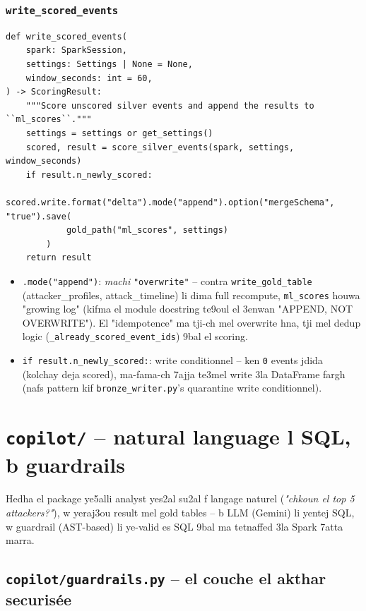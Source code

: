 \documentclass[11pt,a4paper]{report}
\DeclareRobustCommand{\code}[1]{\texttt{#1}}
\DeclareRobustCommand{\file}[1]{\texttt{\color{amber}#1}}
\begin{document}
\subsection{\code{write\_scored\_events}}

\begin{lstlisting}[style=pystyle]
def write_scored_events(
    spark: SparkSession,
    settings: Settings | None = None,
    window_seconds: int = 60,
) -> ScoringResult:
    """Score unscored silver events and append the results to ``ml_scores``."""
    settings = settings or get_settings()
    scored, result = score_silver_events(spark, settings, window_seconds)
    if result.n_newly_scored:
        scored.write.format("delta").mode("append").option("mergeSchema", "true").save(
            gold_path("ml_scores", settings)
        )
    return result
\end{lstlisting}

\begin{itemize}
  \item \code{.mode("append")}: \emph{machi} \code{"overwrite"} --
        contra \code{write\_gold\_table} (attacker\_profiles, attack\_timeline)
        li dima full recompute, \code{ml\_scores} houwa "growing log" (kifma
        el module docstring te9oul el 3enwan "APPEND, NOT OVERWRITE").
        El "idempotence" ma tji-ch mel overwrite hna, tji mel dedup logic
        (\code{\_already\_scored\_event\_ids}) 9bal el scoring.
  \item \code{if result.n\_newly\_scored:}: write conditionnel -- ken
        \code{0} events jdida (kolchay deja scored), ma-fama-ch 7ajja
        te3mel write 3la DataFrame fargh (nafs pattern kif
        \code{bronze\_writer.py}'s quarantine write conditionnel).
\end{itemize}

\chapter{\file{copilot/} -- natural language l SQL, b guardrails}

Hedha el package ye5alli analyst yes2al su2al f langage naturel
(\emph{"chkoun el top 5 attackers?"}), w yeraj3ou result mel gold tables
-- b LLM (Gemini) li yentej SQL, w guardrail (AST-based) li ye-valid es
SQL 9bal ma tetnaffed 3la Spark 7atta marra.

\section{\file{copilot/guardrails.py} -- el couche el akthar securisée}
\end{document}

